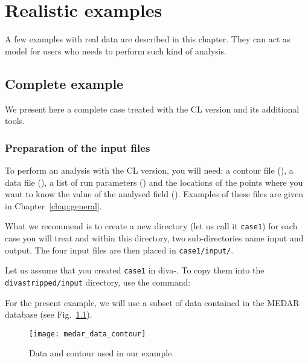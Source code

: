 \chapter{Realistic examples\label{chap:examples}}


A few examples with real data are described in this chapter. They can act as model for users who needs to perform such kind of analysis. 

\minitoc

\newpage

\section{Complete example}

We present here a complete case treated with the CL version and its additional tools.


\subsection{Preparation of the input files\label{prep}}

To perform an analysis with the CL version, you will need: a contour file (), a data file (), a list of run parameters () and the locations of the points where you want to know the value of the analysed field (). Examples of these files are given in Chapter~\ref{chap:general}.

What we recommend is to create a new directory (let us call it \texttt{case1}) for each case you will treat and within this directory, two sub-directories name input and output. The four input files are then placed in \texttt{case1/input/}. 

Let us assume that you created \texttt{case1} in diva-\divaversion. To copy them into the \texttt{diva\-stripped/\-input} directory, use the command: 

\vspace{.25cm}


For the present example, we will use a subset of data contained in the MEDAR database (see Fig.~\ref{dataplotCL}). 

\begin{figure}[htpb]
\centering
\parbox{.65\textwidth}{
\texttt{[image: medar\_data\_contour]}
}\parbox{.35\textwidth}{
\caption{Data and contour used in our example.\label{dataplotCL}}
}
\end{figure}


